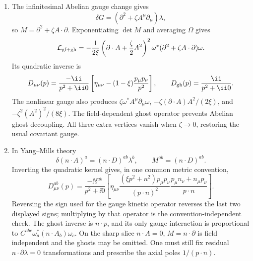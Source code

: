 \begin{enumerate}
  \begin{enumerate}
    \item[(a)] The infinitesimal Abelian gauge change gives
      \[
        \delta G=(\partial^2+\zeta A^\mu\partial_\mu)\lambda,
      \]
      so \(M=\partial^2+\zeta A\cdot\partial\).  Exponentiating
      \(\det M\) and averaging \(\Omega\) gives
      \[
        \mathcal L_{\rm gf+gh}
        =-\frac1{2\xi}
          \left(\partial\cdot A+\frac{\zeta}{2}A^2\right)^2
          \omega^*(\partial^2+\zeta A\cdot\partial)\omega .
      \]
      Its quadratic inverse is
      \[
        D_{\mu\nu}(p)=\frac{-\ii}{p^2+\ii0}
          \left[\eta_{\mu\nu}-(1-\xi)\frac{p_\mu p_\nu}{p^2}\right],
        \qquad D_{\rm gh}(p)=\frac{\ii}{p^2+\ii0}.
      \]
      The nonlinear gauge also produces
      \(\zeta\omega^*A^\mu\partial_\mu\omega\),
      \(-\zeta(\partial\cdot A)A^2/(2\xi)\), and
      \(-\zeta^2(A^2)^2/(8\xi)\).  The field-dependent ghost operator
      prevents Abelian ghost decoupling.  All three extra vertices vanish
      when \(\zeta\to0\), restoring the usual covariant gauge.
    \item[(b)] In Yang--Mills theory
      \[
        \delta(n\cdot A)^a=(n\cdot D)^{ab}\lambda^b,
        \qquad M^{ab}=(n\cdot D)^{ab}.
      \]
      Inverting the quadratic kernel gives, in one common metric convention,
      \[
        D_{\mu\nu}^{ab}(p)=\frac{-\ii\delta^{ab}}{p^2+\ii0}
        \left[\eta_{\mu\nu}
          \frac{(\xi p^2+n^2)p_\mu p_\nu}{(p\cdot n)^2}
          \frac{p_\mu n_\nu+n_\mu p_\nu}{p\cdot n}\right].
      \]
      Reversing the sign used for the gauge kinetic operator reverses the
      last two displayed signs; multiplying by that operator is the
      convention-independent check.  The ghost inverse is \(n\cdot p\),
      and its only gauge interaction is proportional to
      \(C^{abc}\omega_a^*(n\cdot A_b)\omega_c\).  On the sharp slice
      \(n\cdot A=0\), \(M=n\cdot\partial\) is field independent and the
      ghosts may be omitted.  One must still fix residual
      \(n\cdot\partial\lambda=0\) transformations and prescribe the axial
      poles \(1/(p\cdot n)\).
  \end{enumerate}


\end{enumerate}
